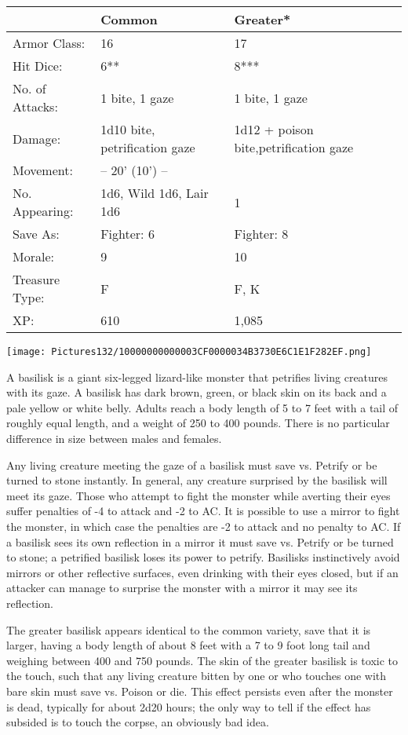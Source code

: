 \documentclass[a4paper,twoside,openany,10pt]{book}
\begin{document}
\begin{multicols}{2}
\begin{tabularx}{0.48\textwidth}{lXX}
& Common & Greater* \\\hline
Armor Class: & 16 & 17 \\\hline
Hit Dice: & 6** & 8*** \\\hline
No. of Attacks: & 1 bite, 1 gaze & 1 bite, 1 gaze \\\hline
Damage: & 1d10 bite, petrification gaze & 1d12 + poison bite,petrification gaze \\\hline
Movement: & -- 20' (10') -- & \\\hline
No. Appearing: & 1d6, Wild 1d6, Lair 1d6 & 1 \\\hline
Save As: & Fighter: 6 & Fighter: 8 \\\hline
Morale: & 9 & 10 \\\hline
Treasure Type: & F & F, K \\\hline
XP: & 610 & 1,085 \\\hline
\end{tabularx}\medskip


\begin{center}
	\texttt{[image: Pictures132/10000000000003CF0000034B3730E6C1E1F282EF.png]}
\end{center}

A basilisk is a giant six-legged lizard-like monster that petrifies living creatures with its gaze. A basilisk has dark brown, green, or black skin on its back and a pale yellow or white belly. Adults reach a body length of 5 to 7 feet with a tail of roughly equal length, and a weight of 250 to 400 pounds. There is no particular difference in size between males and females.

Any living creature meeting the gaze of a basilisk must save vs. Petrify or be turned to stone instantly. In general, any creature surprised by the basilisk will meet its gaze. Those who attempt to fight the monster while averting their eyes suffer penalties of -4 to attack and -2 to AC. It is possible to use a mirror to fight the monster, in which case the penalties are -2 to attack and no penalty to AC. If a basilisk sees its own reflection in a mirror it must save vs. Petrify or be turned to stone; a petrified basilisk loses its power to petrify. Basilisks instinctively avoid mirrors or other reflective surfaces, even drinking with their eyes closed, but if an attacker can manage to surprise the monster with a mirror it may see its reflection.

The greater basilisk appears identical to the common variety, save that it is larger, having a body length of about 8 feet with a 7 to 9 foot long tail and weighing between 400 and 750 pounds. The skin of the greater basilisk is toxic to the touch, such that any living creature bitten by one or who touches one with bare skin must save vs. Poison or die. This effect persists even after the monster is dead, typically for about 2d20 hours; the only way to tell if the effect has subsided is to touch the corpse, an obviously bad idea.


\end{multicols}
\end{document}
